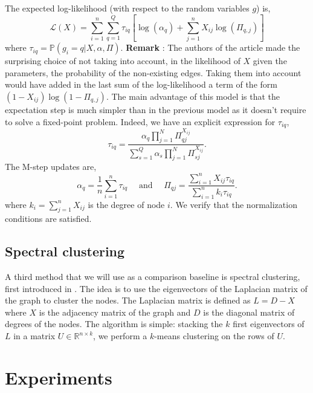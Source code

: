 \documentclass[switch, 12pt]{article}
\newcommand{\jump}{\newline\newline}
\begin{document}
\begin{multicols}{2}
    The expected log-likelihood (with respect to the random variables $g$) is,
    \begin{equation}
        \mathcal{L}(X) = \sum_{i=1}^n\sum_{q=1}^Q \tau_{iq} \left[ \log(\alpha_q) + \sum_{j=1}^n X_{ij} \log(\Pi_{q, j}) \right]
    \end{equation}
    where $\tau_{iq} = \mathbb{P}(g_i = q | X, \alpha, \Pi)$.
    \newline
    \textbf{Remark} : The authors of the article made the surprising choice of not taking into account, in the likelihood of $X$ given the parameters, the probability of the non-existing edges. Taking them into account would have added in the last sum of the log-likelihood a term of the form $(1 - X_{ij}) \log(1 - \Pi_{q, j})$.
    \jump
    The main advantage of this model is that the expectation step is much simpler than in the previous model as it doesn't require to solve a fixed-point problem. Indeed, we have an explicit expression for $\tau_{iq}$,
    $$ \tau_{iq} = \frac{\alpha_q\prod_{j=1}^N \Pi_{qj}^{X_{ij}}}{\sum_{s=1}^Q \alpha_s\prod_{j=1}^N \Pi_{sj}^{X_{ij}}}.$$
    The M-step updates are,
    $$ \alpha_q = \frac{1}{n} \sum_{i=1}^n \tau_{iq} \quad\text{ and }\quad \Pi_{qj} = \frac{\sum_{i=1}^n X_{ij}\tau_{iq} }{\sum_{i=1}^n k_i \tau_{iq}}.$$
    where $k_i = \sum_{j=1}^n X_{ij}$ is the degree of node $i$. We verify that the normalization conditions are satisfied.

    \subsection{Spectral clustering}
    \label{subsec:spectral}
    A third method that we will use as a comparison baseline is spectral clustering, first introduced in \cite{spectral}. The idea is to use the eigenvectors of the Laplacian matrix of the graph to cluster the nodes. The Laplacian matrix is defined as $ L = D - X$ where $X$ is the adjacency matrix of the graph and $D$ is the diagonal matrix of degrees of the nodes.
    \jump
    The algorithm is simple: stacking the $k$ first eigenvectors of $L$ in a matrix $U \in \mathbb{R}^{n \times k}$, we perform a $k$-means clustering on the rows of $U$.

    \section{Experiments}
    \label{sec:experiments}


\end{multicols}
\end{document}
